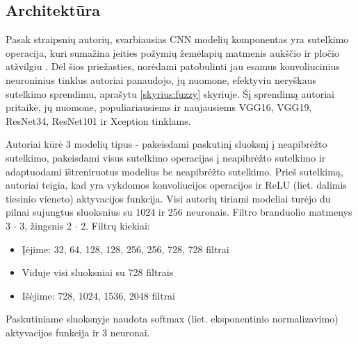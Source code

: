 \documentclass[fleqn]{VUMIFKompMagistrinis}
\begin{document}
\subsection{Architektūra}

Pasak straipsnių autorių, svarbiausias CNN modelių komponentas yra sutelkimo operacija, kuri sumažina įeities požymių žemėlapių matmenis aukščio ir pločio atžvilgiu \cite{HASAN2023}. Dėl šios priežasties, norėdami patobulinti jau esamus konvoliucinius neuroninius tinklus autoriai panaudojo, jų nuomone, efektyviu neryškaus sutelkimo sprendimu, aprašytu \ref{skyrius:fuzzy} skyriuje. Šį sprendimą autoriai pritaikė, jų nuomone, populiariausiems ir naujausiems VGG16, VGG19, ResNet34, ResNet101 ir Xception tinklams. 

\par
Autoriai kūrė 3 modelių tipus - pakeisdami paskutinį sluoksnį į neapibrėžto sutelkimo, pakeisdami visus sutelkimo operacijas į neapibrėžto sutelkimo ir adaptuodami ištreniruotus modelius be neapibrėžto sutelkimo. Prieš sutelkimą, autoriai teigia, kad yra vykdomos konvoliucijos operacijos ir ReLU (liet. dalimis tiesinio vieneto) aktyvacijos funkcija. Visi autorių tiriami modeliai turėjo du pilnai sujungtus sluoksnius su 1024 ir 256 neuronais. Filtro branduolio matmenys 3 \(\cdot\) 3, žingsnis 2 \(\cdot\) 2. Filtrų kiekiai: 
\begin{itemize}
    \item Įėjime: 32, 64, 128, 128, 256, 256, 728, 728 filtrai
    \item Viduje visi sluoksniai su 728 filtrais
    \item Išėjime: 728, 1024, 1536, 2048 filtrai
\end{itemize}
Paskutiniame sluoksnyje naudota softmax (liet. eksponentinio normalizavimo) aktyvacijos funkcija ir 3 neuronai.
\end{document}
